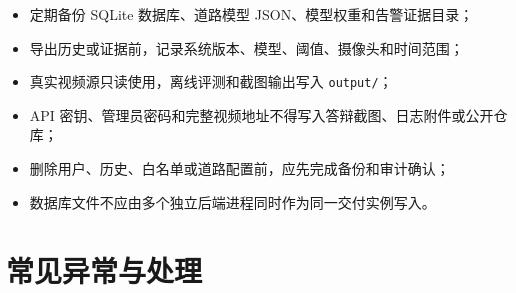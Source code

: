\begin{itemize}
\tightlist
\item
  定期备份 SQLite 数据库、道路模型 JSON、模型权重和告警证据目录；
\item
  导出历史或证据前，记录系统版本、模型、阈值、摄像头和时间范围；
\item
  真实视频源只读使用，离线评测和截图输出写入 \texttt{output/\allowbreak{}}；
\item
  API 密钥、管理员密码和完整视频地址不得写入答辩截图、日志附件或公开仓库；
\item
  删除用户、历史、白名单或道路配置前，应先完成备份和审计确认；
\item
  数据库文件不应由多个独立后端进程同时作为同一交付实例写入。
\end{itemize}

\section{常见异常与处理}\label{manual-ux5e38ux89c1ux5f02ux5e38ux4e0eux5904ux7406}

